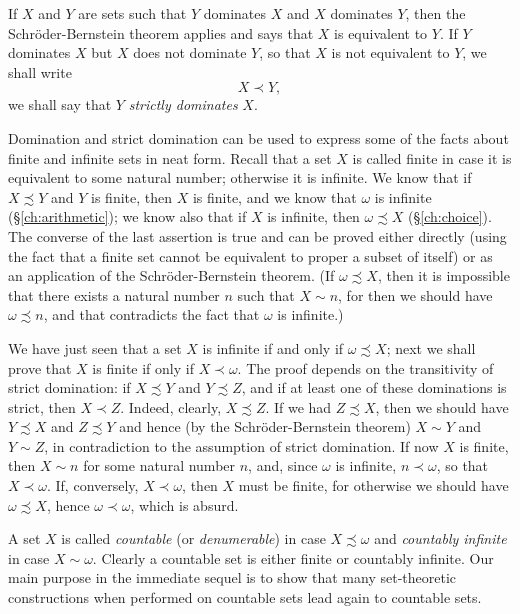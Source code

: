 
If $X$ and $Y$ are sets such that $Y$ dominates $X$ and $X$ dominates $Y$, then the Schröder-Bernstein theorem applies and says that $X$ is equivalent to $Y$. If $Y$ dominates $X$ but $X$ does not dominate $Y$, so that $X$ is not equivalent to $Y$, we shall write 
\begin{equation*}
X \prec Y, 
\end{equation*}
we shall say that $Y$ \textit{strictly dominates} $X$.

Domination and strict domination can be used to express some of the facts about finite and infinite sets in neat form. Recall that a set $X$ is called finite in case it is equivalent to some natural number; otherwise it is infinite. We know that if $X \precsim Y$ and $Y$ is finite, then $X$ is finite, and we know that $\omega$ is infinite (\S \ref{ch:arithmetic}); we know also that if $X$ is infinite, then $\omega \precsim X$ (\S \ref{ch:choice}). The converse of the last assertion is true and can be proved either directly (using the fact that a finite set cannot be equivalent to proper a subset of itself) or as an application of the Schröder-Bernstein theorem. (If $\omega \precsim X$, then it is impossible that there exists a natural number $n$ such that $X \sim n$, for then we should have $\omega \precsim n$, and that contradicts the fact that $\omega$ is infinite.) 

We have just seen that a set $X$ is infinite if and only if $\omega \precsim X$; next we shall prove that $X$ is finite if only if $X \prec \omega$. The proof depends on the transitivity of strict domination: if $X \precsim Y$ and $Y \precsim Z$, and if at least one of these dominations is strict, then $X \prec Z$. Indeed, clearly, $X \precsim Z$. If we had $Z \precsim X$, then we should have $Y \precsim X$ and $Z \precsim Y$ and hence (by the Schröder-Bernstein theorem) $X \sim Y$ and $Y \sim Z$, in contradiction to the assumption of strict domination. If now $X$ is finite, then $X \sim n$ for some natural number $n$, and, since $\omega$ is infinite, $n \prec \omega$, so that $X \prec \omega$. If, conversely, $X \prec \omega$, then $X$ must be finite, for otherwise we should have $\omega \precsim X$, hence $\omega \prec \omega$, which is absurd. 

A set $X$ is called \textit{countable} (or \textit{denumerable}) in case $X \precsim \omega$ and \textit{countably infinite} in case $X \sim \omega$. Clearly a countable set is either finite or countably infinite. Our main purpose in the immediate sequel is to show that many set-theoretic constructions when performed on countable sets lead again to countable sets. 

